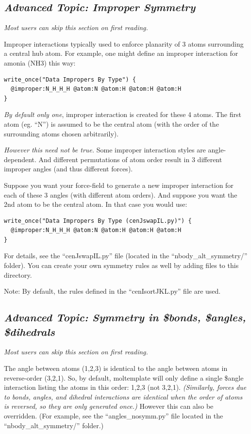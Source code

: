 \documentclass[11pt]{article}
\begin{document}
\subsection{\textit{Advanced Topic: Improper Symmetry}}
\textit{Most users can skip this section on first reading.}

Improper interactions typically used to enforce planarity of 3 atoms surrounding
a central hub atom.  For example, one might define an improper interaction for amonia (NH3) this way:
\begin{verbatim}
write_once("Data Impropers By Type") {
  @improper:N_H_H_H @atom:N @atom:H @atom:H @atom:H
}
\end{verbatim}
\textit{By default only one},
improper interaction is created for these 4 atoms.
The first atom (eg. ``N'') is assumed to be the central atom
(with the order of the surrounding atoms chosen arbitrarily).

\textit{However this need not be true.}  Some improper interaction styles are angle-dependent.  And different permutations of atom order result in 3 different improper angles (and thus different forces).

Suppose you want your force-field to generate a new improper interaction for each of these 3 angles (with different atom orders).  And suppose you want the 2nd atom to be the central atom.  In that case you would use:
\begin{verbatim}
write_once("Data Impropers By Type (cenJswapIL.py)") {
  @improper:N_H_H_H @atom:N @atom:H @atom:H @atom:H
}
\end{verbatim}
For details, see the ``cenJswapIL.py'' file (located in the ``nbody\_alt\_symmetry/'' folder).  You can create your own symmetry rules as well by adding files to this directory.

Note: By default, the rules defined in the ``cenIsortJKL.py'' file are used.

\subsection{\textit{Advanced Topic: Symmetry in \$bonds, \$angles, \$dihedrals}}
\textit{Most users can skip this section on first reading.}

The angle between atoms (1,2,3) is identical to the angle between atoms
in reverse-order (3,2,1).
So, by default, moltemplate will only define a single
\$angle interaction listing the atoms in this order: 1,2,3 (not 3,2,1).
\textit{(Similarly, forces due to bonds, angles, and
dihedral interactions are identical when the order of atoms is reversed,
so they are only generated once.)}
However this can also be overridden.  (For example, see the ``angles\_nosymm.py'' file located in the ``nbody\_alt\_symmetry/'' folder.)
\end{document}
